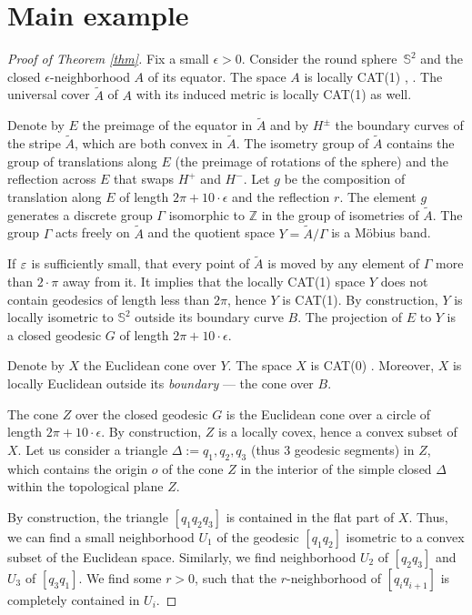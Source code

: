 \documentclass[a4paper,10pt]{article}
\begin{document}
\section{Main example}

\begin{proof}[Proof of Theorem \ref{thm}]
Fix a small $\epsilon >0$.
Consider the round sphere~$\mathbb{S}^2$ and the closed 
$\epsilon$-neighborhood $A$  of its equator.
The space $A$ is locally CAT(1) \cite{ABB-1993}, \cite{LWcurv}.
The universal cover $\tilde A$ of $A$ with its induced metric is locally CAT(1) as well. 

Denote by $E$ the preimage of the equator in $\tilde A$  and by $H^{\pm}$ the boundary curves of the stripe $\tilde A$, which are both convex in $\tilde A$.
The isometry group of $\tilde A$ 
contains the group of translations  along $E$ (the preimage of rotations of the sphere) and 
the reflection across $E$ that swaps $H^+$ and $H^-$.
Let $g$   be the composition of translation along $E$  of length $2\pi +10\cdot\epsilon$  and the reflection $r$.
The element $g$ generates a discrete group $\Gamma$ isomorphic to $\mathbb Z$ in the group of isometries  of $\tilde A$.
The group $\Gamma$ acts freely on $\tilde A$ and the quotient space $Y =\tilde A/\Gamma$ is a Möbius band.

If $\varepsilon$ is sufficiently small,  that every point of $\tilde A$ is moved by any element of $\Gamma$ more than $2\cdot\pi$ away from it.
It implies that the locally CAT(1) space $Y$ does not  contain geodesics of length less than $2\pi$, hence $Y$ is CAT(1).
By construction, $Y$ is locally isometric to $\mathbb{S}^2$ outside its boundary curve $B$.
The projection of $E$ to $Y$ is a closed geodesic $G$ of length $2\pi +10\cdot\epsilon$.

Denote by $X$ the Euclidean cone over $Y$.
The space $X$ is CAT(0)  \cite{BBI}.
Moreover, $X$ is locally Euclidean outside its \emph{boundary} --- the cone over $B$.

The cone $Z$ over the closed geodesic $G$ is  the Euclidean cone over a circle of length $2\pi +10\cdot\epsilon$. By construction,
$Z$ is a locally covex, hence a convex subset of~$X$.
Let us consider a triangle
$\Delta := q_1,q_2,q_3$   (thus 3 geodesic segments)
in $Z$, which contains the origin $o$ of the cone $Z$ in the interior of the simple closed $\Delta$ within the topological plane $Z$.

By construction, the triangle $[q_1q_2q_3]$ is contained in the flat part of $X$.
Thus, we can find a small neighborhood $U_1$ of the geodesic $[q_1q_2]$ isometric to a convex subset of the Euclidean space.
Similarly, we find neighborhood $U_2$ of $[q_2q_3]$ and $U_3$ of $[q_3q_1]$.
We find some $r>0$, such that the $r$-neighborhood of $[q_iq_{i+1}]$ is completely contained in $U_i$.


\end{proof}
\end{document}
